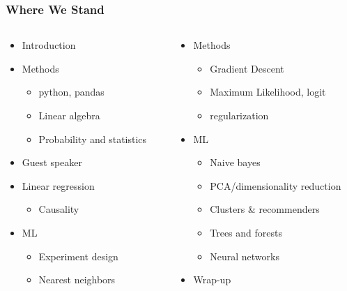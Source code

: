 \documentclass[mathserif, xcolor=table, svgnames]{beamer}
\begin{document}
\begin{frame}
\frametitle{Where We Stand}
\begin{columns}
  \begin{column}{0.5\linewidth}
    \begin{itemize}
    \item Introduction
    \item Methods
      \begin{itemize}
      \item python, pandas
      \item Linear algebra
      \item Probability and statistics
      \end{itemize}
    \item Guest speaker
    \item \alert{Linear regression}
      \begin{itemize}
      \item Causality
      \end{itemize}
    \item ML
      \begin{itemize}
      \item Experiment design
      \item Nearest neighbors
      \end{itemize}
    \end{itemize}
  \end{column}
  \begin{column}{0.5\linewidth}
    \begin{itemize}
    \item Methods
      \begin{itemize}
      \item Gradient Descent 
      \item Maximum Likelihood, logit
      \item regularization
      \end{itemize}
    \item ML
      \begin{itemize}
      \item Naive bayes
      \item PCA/dimensionality reduction
      \item Clusters \& recommenders
      \item Trees and forests
      \item Neural networks
      \end{itemize}
    \item Wrap-up
    \end{itemize}
  \end{column}
\end{columns}
\end{frame}
\end{document}
